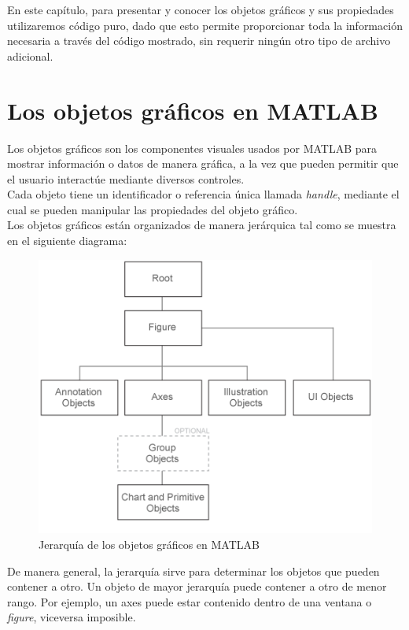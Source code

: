 En este capítulo, para presentar y conocer los objetos gráficos y sus
propiedades utilizaremos código puro, dado que esto permite proporcionar
toda la información necesaria a través del código mostrado, sin requerir
ningún otro tipo de archivo adicional.

\section{Los objetos gráficos en MATLAB}\label{los-objetos-graficos-en-matlab}

Los objetos gráficos son los componentes visuales usados por MATLAB para
mostrar información o datos de manera gráfica, a la vez que pueden
permitir que el usuario interactúe mediante diversos controles. \\

Cada objeto tiene un identificador o referencia única llamada
\emph{handle}, mediante el cual se pueden manipular las propiedades del
objeto gráfico. \\

Los objetos gráficos están organizados de manera jerárquica tal como se
muestra en el siguiente diagrama:

\begin{figure}[htbp]
\centering
\includegraphics[scale=0.85]{images/ch8/objetos_graficos.png}
\caption{Jerarquía de los objetos gráficos en MATLAB}
\end{figure}

De manera general, la jerarquía sirve para determinar los objetos que
pueden contener a otro. Un objeto de mayor jerarquía puede contener a
otro de menor rango. Por ejemplo, un axes puede estar contenido dentro
de una ventana o \emph{figure}, viceversa imposible. \\

